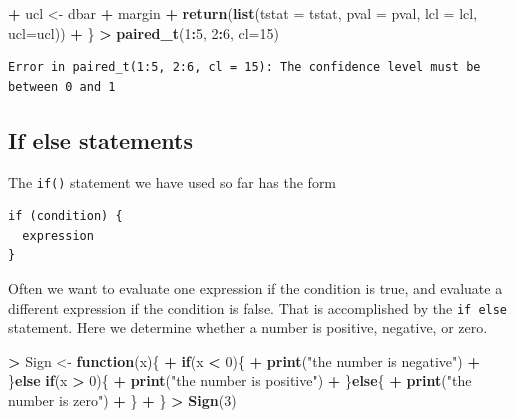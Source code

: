 \documentclass[]{krantz}
\makeatletter
\newenvironment{Shaded}{\begin{snugshade}}{\end{snugshade}}
\newcommand{\KeywordTok}[1]{\textcolor[rgb]{0.27,0.27,0.27}{\textbf{#1}}}
\newcommand{\DataTypeTok}[1]{\textcolor[rgb]{0.27,0.27,0.27}{#1}}
\newcommand{\DecValTok}[1]{\textcolor[rgb]{0.06,0.06,0.06}{#1}}
\newcommand{\StringTok}[1]{\textcolor[rgb]{0.5,0.5,0.5}{#1}}
\newcommand{\ControlFlowTok}[1]{\textcolor[rgb]{0.27,0.27,0.27}{\textbf{#1}}}
\newcommand{\OperatorTok}[1]{\textcolor[rgb]{0.43,0.43,0.43}{\textbf{#1}}}
\newcommand{\NormalTok}[1]{#1}
\newenvironment{kframe}{%
\medskip{}
\setlength{\fboxsep}{.8em}
 \def\at@end@of@kframe{}%
 \ifinner\ifhmode%
  \def\at@end@of@kframe{\end{minipage}}%
  \begin{minipage}{\columnwidth}%
 \fi\fi%
 \def\FrameCommand##1{\hskip\@totalleftmargin \hskip-\fboxsep
 \colorbox{shadecolor}{##1}\hskip-\fboxsep
     \hskip-\linewidth \hskip-\@totalleftmargin \hskip\columnwidth}%
 \MakeFramed {\advance\hsize-\width
   \@totalleftmargin\z@ \linewidth\hsize
   \@setminipage}}%
 {\par\unskip\endMakeFramed%
 \at@end@of@kframe}
\renewenvironment{Shaded}{\begin{kframe}}{\end{kframe}}
\makeatother
\begin{document}
\begin{Shaded}
\begin{Highlighting}[]
\OperatorTok{+}\StringTok{     }\NormalTok{ucl <-}\StringTok{ }\NormalTok{dbar }\OperatorTok{+}\StringTok{ }\NormalTok{margin}
\OperatorTok{+}\StringTok{     }\KeywordTok{return}\NormalTok{(}\KeywordTok{list}\NormalTok{(}\DataTypeTok{tstat =}\NormalTok{ tstat, }\DataTypeTok{pval =}\NormalTok{ pval, }\DataTypeTok{lcl =}\NormalTok{ lcl, }\DataTypeTok{ucl=}\NormalTok{ucl))}
\OperatorTok{+}\StringTok{ }\NormalTok{\}}
\OperatorTok{>}\StringTok{ }\KeywordTok{paired_t}\NormalTok{(}\DecValTok{1}\OperatorTok{:}\DecValTok{5}\NormalTok{, }\DecValTok{2}\OperatorTok{:}\DecValTok{6}\NormalTok{, }\DataTypeTok{cl=}\DecValTok{15}\NormalTok{)}
\end{Highlighting}
\end{Shaded}

\begin{verbatim}
Error in paired_t(1:5, 2:6, cl = 15): The confidence level must be between 0 and 1
\end{verbatim}

\subsection{If else statements}\label{if-else-statements}

The \texttt{if()} statement we have used so far has the form

\begin{verbatim}
if (condition) {
  expression
}
\end{verbatim}

Often we want to evaluate one expression if the condition is true, and
evaluate a different expression if the condition is false. That is
accomplished by the \texttt{if\ else} statement. Here we determine
whether a number is positive, negative, or zero.

\begin{Shaded}
\begin{Highlighting}[]
\OperatorTok{>}\StringTok{ }\NormalTok{Sign <-}\StringTok{ }\ControlFlowTok{function}\NormalTok{(x)\{}
\OperatorTok{+}\StringTok{     }\ControlFlowTok{if}\NormalTok{(x }\OperatorTok{<}\StringTok{ }\DecValTok{0}\NormalTok{)\{}
\OperatorTok{+}\StringTok{         }\KeywordTok{print}\NormalTok{(}\StringTok{"the number is negative"}\NormalTok{)}
\OperatorTok{+}\StringTok{     }\NormalTok{\}}\ControlFlowTok{else} \ControlFlowTok{if}\NormalTok{(x }\OperatorTok{>}\StringTok{ }\DecValTok{0}\NormalTok{)\{}
\OperatorTok{+}\StringTok{         }\KeywordTok{print}\NormalTok{(}\StringTok{"the number is positive"}\NormalTok{)}
\OperatorTok{+}\StringTok{     }\NormalTok{\}}\ControlFlowTok{else}\NormalTok{\{}
\OperatorTok{+}\StringTok{         }\KeywordTok{print}\NormalTok{(}\StringTok{"the number is zero"}\NormalTok{)}
\OperatorTok{+}\StringTok{     }\NormalTok{\}}
\OperatorTok{+}\StringTok{ }\NormalTok{\}}
\OperatorTok{>}\StringTok{ }\KeywordTok{Sign}\NormalTok{(}\DecValTok{3}\NormalTok{)}
\end{Highlighting}
\end{Shaded}
\end{document}
